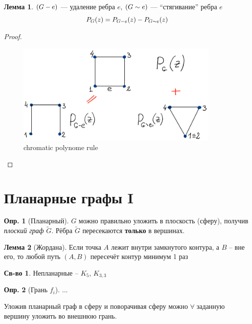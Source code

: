 \documentclass[a4paper,12pt]{article}
\numberwithin{figure}{section}
\theoremstyle{definition}
\newtheorem{definition}{Опр.}[section]
\newtheorem*{property}{Св-во}  %
\theoremstyle{definition}
\newtheorem{lemma}{Лемма}[section]
\def\iiany{$\forall\;$}
\begin{document}
\begin{lemma} $(G - e)$ --- удаление ребра $e$,
	          $(G \sim e)$ --- ``стягивание'' ребра $e$
	\[ P_{G}(z) = P_{G - e}(z) - P_{G \sim e}(z) \]
\end{lemma}
\begin{proof}
	\hspace{1pt}
	\begin{figure}[H]
		\centering
		\includegraphics[width=10cm]{chromatic-polynome-rule.png}
		\caption{chromatic polynome rule}
	\end{figure}
	\hspace{1pt}
\end{proof}



\section{Планарные графы I}

\begin{definition}[Планарный]
	$G$ можно правильно уложить в плоскость (сферу), получив \textit{плоский граф} $\tilde{G}$. Рёбра $\tilde{G}$ пересекаются \textbf{только} в вершинах.
\end{definition}

\begin{lemma}[Жордана]
	Если точка $A$ лежит внутри замкнутого контура, а $B$ -- вне его, то любой путь $(A,B)$ пересечёт контур минимум 1 раз
\end{lemma}

\begin{property} Непланарные -- $K_5$, $K_{3,3}$ \end{property}

\begin{definition}[Грань $f_i$] ... \end{definition}

Уложив планарный граф в сферу и поворачивая сферу можно \iiany заданную вершину уложить во внешнюю грань.
\end{document}
